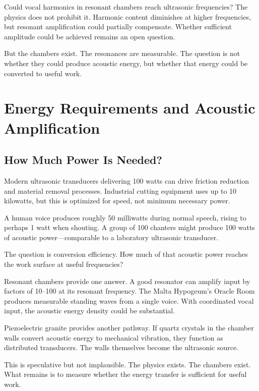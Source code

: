 \documentclass[11pt]{article}
\begin{document}
Could vocal harmonics in resonant chambers reach ultrasonic frequencies? The physics does not prohibit it. Harmonic content diminishes at higher frequencies, but resonant amplification could partially compensate. Whether sufficient amplitude could be achieved remains an open question.

But the chambers exist. The resonances are measurable. The question is not whether they could produce acoustic energy, but whether that energy could be converted to useful work.

\section{Energy Requirements and Acoustic Amplification}

\subsection{How Much Power Is Needed?}

Modern ultrasonic transducers delivering 100 watts can drive friction reduction and material removal processes. Industrial cutting equipment uses up to 10 kilowatts, but this is optimized for speed, not minimum necessary power.

A human voice produces roughly 50 milliwatts during normal speech, rising to perhaps 1 watt when shouting. A group of 100 chanters might produce 100 watts of acoustic power---comparable to a laboratory ultrasonic transducer.

The question is conversion efficiency. How much of that acoustic power reaches the work surface at useful frequencies?

Resonant chambers provide one answer. A good resonator can amplify input by factors of 10--100 at its resonant frequency. The Malta Hypogeum's Oracle Room produces measurable standing waves from a single voice. With coordinated vocal input, the acoustic energy density could be substantial.

Piezoelectric granite provides another pathway. If quartz crystals in the chamber walls convert acoustic energy to mechanical vibration, they function as distributed transducers. The walls themselves become the ultrasonic source.

This is speculative but not implausible. The physics exists. The chambers exist. What remains is to measure whether the energy transfer is sufficient for useful work.
\end{document}
